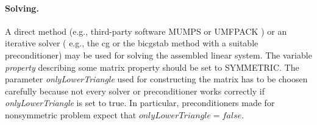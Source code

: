 \documentclass[11pt]{article}
\begin{document}
\paragraph{Solving.}

A direct method (e.g., third-party software {\sc MUMPS} or {\sc UMFPACK} ) or an iterative solver ( e.g., the cg or the bicgstab method with
a suitable preconditioner) may be used for solving the assembled linear system. The variable {\em property} describing some
matrix property should be set to {\sc SYMMETRIC}.
The parameter {\em onlyLowerTriangle} used for constructing the matrix has to be choosen carefully because not every solver or
preconditioner works correctly if {\em onlyLowerTriangle} is set to true. In particular, preconditioners made for nonsymmetric problem expect that
$onlyLowerTriangle = false$.
\end{document}
